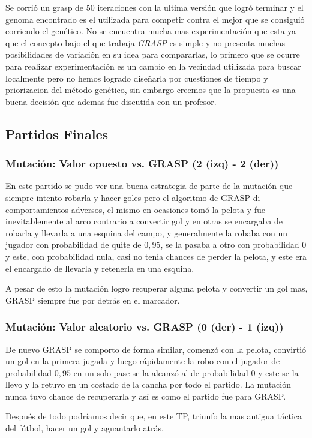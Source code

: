 Se corrió un grasp de 50 iteraciones con la ultima versión  que logró terminar y el genoma encontrado es el utilizada para competir
contra el mejor que se consiguió corriendo el genético. No se encuentra mucha mas experimentación que esta ya que el concepto
bajo el que trabaja \emph{GRASP} es simple y no presenta muchas posibilidades de variación en su idea para compararlas,
lo primero que se ocurre para realizar experimentación es un cambio en la vecindad utilizada para buscar localmente
 pero no hemos logrado diseñarla por cuestiones de tiempo y priorizacion del método genético, sin embargo
creemos que la propuesta es una buena decisión que ademas fue discutida con un profesor.



\subsection{Partidos Finales}


\subsubsection*{Mutación: Valor opuesto vs. GRASP (2 (izq) - 2 (der))}

En este partido se pudo ver una buena estrategia de parte de la mutación que siempre intento robarla y hacer goles pero el algoritmo de GRASP
di comportamientos adversos, el mismo en ocasiones tomó la pelota y fue inevitablemente al arco contrario a convertir gol y en otras
se encargaba de robarla y llevarla a una esquina del campo, y generalmente la robaba con un jugador con probabilidad de quite de $0,95$,
se la pasaba a otro con probabilidad $0$ y este, con probabilidad nula, casi no tenia chances de perder la pelota, y este era el encargado
de llevarla y retenerla en una esquina.

A pesar de esto la mutación logro recuperar alguna pelota y convertir un gol mas, GRASP siempre fue por detrás en el marcador.



\subsubsection*{Mutación: Valor aleatorio vs. GRASP (0 (der) - 1 (izq))}

De nuevo GRASP se comporto de forma similar, comenzó con la pelota, convirtió un gol en la primera jugada y luego rápidamente la robo con
el jugador de probabilidad $0,95$ en un solo pase se la alcanzó al de probabilidad $0$ y este se la llevo y la retuvo en un costado de la cancha
por todo el partido. La mutación nunca tuvo chance de recuperarla y así es como el partido fue para GRASP.


Después de todo podríamos decir que, en este TP, triunfo la mas antigua táctica del fútbol, hacer un gol y aguantarlo atrás.
